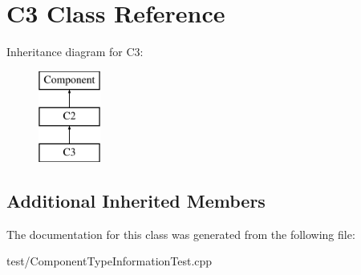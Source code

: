 \hypertarget{classC3}{}\section{C3 Class Reference}
\label{classC3}
Inheritance diagram for C3\+:\begin{figure}[H]
\begin{center}
\leavevmode
\includegraphics[height=3.000000cm]{classC3}
\end{center}
\end{figure}
\subsection*{Additional Inherited Members}


The documentation for this class was generated from the following file\+:\begin{DoxyCompactItemize}
\item 
test/Component\+Type\+Information\+Test.\+cpp\end{DoxyCompactItemize}
